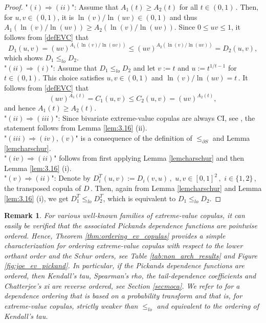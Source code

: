 \documentclass{article}
\newtheorem{remark}[theorem]{Remark}
\def\of#1{\left(#1\right)} %
\begin{document}
\begin{proof}
    "$(i)\Rightarrow(ii)$": Assume that $A_1(t) \geq A_2(t)$ for all \(t\in (0,1)\,.\)
    Then, for $u,v \in (0,1)$,
    it is $\ln(v)/\ln(uv)\in(0,1)$ and thus $A_1(\ln(v)/\ln(uv)) \geq A_2(\ln(v)/\ln(uv))$.
    Since $0\leq uv \leq 1$, it follows from \eqref{defEVC} that 
    \[
        D_1(u,v)
        = (uv)^{A_1\of{\ln(v)/\ln(uv)}}
        \leq (uv)^{A_2\of{\ln(v)/\ln(uv)}}
        = D_2(u,v)
    ,\]
    which shows $D_1 \leq_{lo} D_2$. \\
    "$(ii)\Rightarrow(i)$": Assume that $D_1 \leq_{lo} D_2$ and let $v:=t$ and $u:=t^{1/t-1}$ for $t\in(0, 1)$.
    This choice satisfies $u,v\in(0, 1)$ and $\ln(v)/\ln(uv)=t\,.$ It follows from \eqref{defEVC} that
    \[
        (uv)^{A_1\of{t}}
        = C_1(u,v)
        \leq C_2(u,v)
        = (uv)^{A_2\of{t}}
    ,\]
    and hence $A_1(t) \geq A_2(t)$. \\
    "$(ii)\Rightarrow(iii)$": Since bivariate extreme-value copulas are always CI, see \cite{Guillem-2000}, the statement follows from Lemma \ref{lem:3.16} (ii). \\
    "$(iii)\Rightarrow(iv), (v)$" is a consequence of the definition of $\leq_{\partial S}$ and Lemma \ref{lemcharschur}. \\
    "$(iv)\Rightarrow(ii)$" follows from first applying Lemma \ref{lemcharschur} and then Lemma \ref{lem:3.16} (i).
    \\
    "$(v)\Rightarrow(ii)$": Denote by $D^T_i(u, v) := D_i(v, u)\,,$ $u,v \in[0,1]^2\,,$ $i\in \{1,2\}\,,$ the transposed copula of \(D\,.\)
    Then, again from Lemma \ref{lemcharschur} and Lemma \ref{lem:3.16} (i), we get $D^T_1\leq_{lo} D^T_2$, which is equivalent to $D_1\leq_{lo} D_2$.
\end{proof}

\begin{remark}
For various well-known families of extreme-value copulas, it can easily be verified that the associated Pickands dependence functions are pointwise ordered.
Hence, Theorem \ref{thm:ordering_ev_copulas} provides a simple characterization for ordering extreme-value copulas with respect to the lower orthant order and the Schur orders, see Table \ref{tab:non_arch_results} and Figure \ref{fig:joe_ev_pickand}.
In particular, if the Pickands dependence functions are ordered, then Kendall's tau, Spearman's rho, the tail-dependence coefficients and Chatterjee's xi are reverse ordered, see Section \ref{secmoca}.
We refer to \cite{Cap-1997,Cap-2000} for a dependence ordering that is based on a probability transform and that is, for extreme-value copulas, strictly weaker than \(\leq_{lo}\) and equivalent to the ordering of Kendall's tau.
\end{remark}
\end{document}
